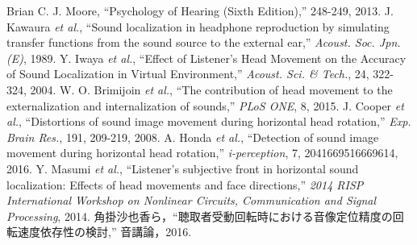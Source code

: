 \documentclass[12pt,a4j]{jsarticle}
\renewcommand{\ }{\hspace{1zw}}
\begin{document}
\begin{thebibliography}{1}
     Brian C. J. Moore, ``Psychology of Hearing (Sixth Edition),'' 248-249, 2013.
     J. Kawaura {\it et al.}, ``Sound localization in headphone reproduction by simulating transfer functions from the sound source to the external ear,'' {\it Acoust. Soc. Jpn.(E)}, 1989.
     Y. Iwaya {\it et al.}, ``Effect of Listener's Head Movement on the Accuracy of Sound Localization in Virtual Environment,'' {\it Acoust. Sci. \& Tech.}, 24, 322-324, 2004.
     W. O. Brimijoin {\it et al.}, ``The contribution of head movement to the externalization and internalization of sounds,'' {\it PLoS ONE}, 8, 2015.
     J. Cooper {\it et al.}, ``Distortions of sound image movement during horizontal head rotation,'' {\it Exp. Brain Res.}, 191, 209-219, 2008.
     A. Honda {\it et al.}, ``Detection of sound image movement during horizontal head rotation,'' {\it i-perception}, 7, 2041669516669614, 2016.
     Y. Masumi {\it et al.}, ``Listener's subjective front in horizontal sound localization: Effects of head movements and face directions,'' {\it 2014 RISP International Workshop on Nonlinear Circuits, Communication and Signal Processing}, 2014.
     角掛沙也香ら，``聴取者受動回転時における音像定位精度の回転速度依存性の検討,'' 音講論，2016.


\end{thebibliography}
\end{document}

